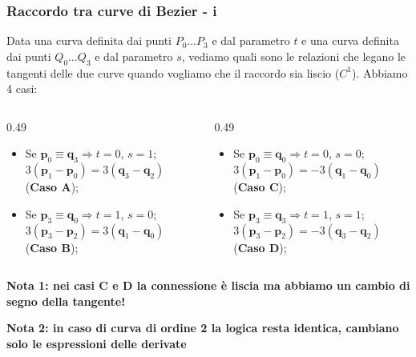 \documentclass{beamer}
\begin{document}
\begin{frame}
\frametitle{Raccordo tra curve di Bezier - i}
Data una curva definita dai punti $P_0 \dots P_3$ e dal parametro $t$ e una curva definita dai punti $Q_0 \dots Q_3$ e dal parametro $s$, vediamo quali sono
    le relazioni che legano le tangenti delle due curve quando vogliamo che il raccordo sia liscio ($C^1$). Abbiamo 4 casi:
\begin{columns}
\begin{column} {0.49\textwidth}

\begin{itemize}
\item Se $\mathbf{p}_0 \equiv \mathbf{q}_3 \Rightarrow t=0$, $s = 1$;
 $3(\mathbf{p}_1-\mathbf{p}_0) = 3(\mathbf{q}_3-\mathbf{q}_2)$ (\textbf{Caso A});
\item Se $\mathbf{p}_3 \equiv \mathbf{q}_0 \Rightarrow t=1$, $s = 0$;
 $3(\mathbf{p}_3-\mathbf{p}_2) = 3(\mathbf{q}_1-\mathbf{q}_0)$ (\textbf{Caso B});
\end{itemize}
\end{column}
\begin{column} {0.49\textwidth}
\begin{itemize}
\item Se $\mathbf{p}_0 \equiv \mathbf{q}_0 \Rightarrow t=0$, $s =0$;
 $3(\mathbf{p}_1-\mathbf{p}_0) = -3(\mathbf{q}_1-\mathbf{q}_0)$ (\textbf{Caso C});
\item Se $\mathbf{p}_3 \equiv \mathbf{q}_3 \Rightarrow t=1$, $s = 1$;
 $3(\mathbf{p}_3-\mathbf{p}_2) = -3(\mathbf{q}_3-\mathbf{q}_2)$ (\textbf{Caso D});
\end{itemize}
\end{column}
\end{columns}
\vspace{0.6cm}
\textbf{Nota 1: nei casi C e D la connessione \`e liscia ma abbiamo un cambio di segno della tangente!}
\vspace{0.3cm}

    \textbf{Nota 2: in caso di curva di ordine 2 la logica resta identica, cambiano solo le espressioni delle derivate}
\end{frame}
%
\end{document}
